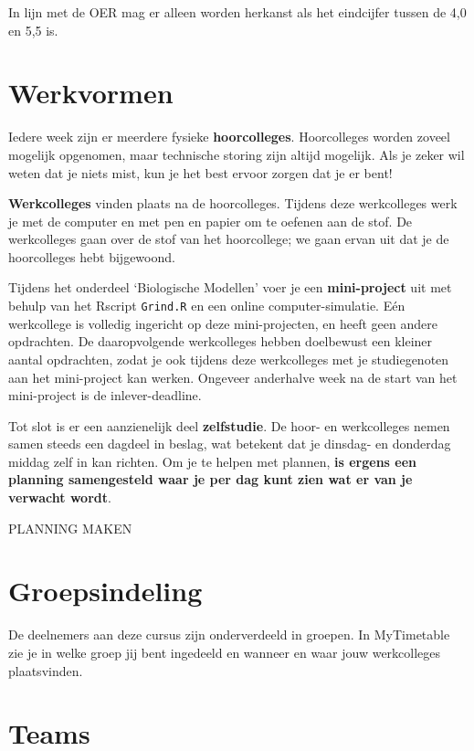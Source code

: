 \documentclass[
  a4paper,
]{scrbook}
\theoremstyle{definition}
\theoremstyle{remark}
\begin{document}
In lijn met de OER mag er alleen worden herkanst als het eindcijfer
tussen de 4,0 en 5,5 is.

\section{Werkvormen}\label{werkvormen}

Iedere week zijn er meerdere fysieke \textbf{hoorcolleges}. Hoorcolleges
worden zoveel mogelijk opgenomen, maar technische storing zijn altijd
mogelijk. Als je zeker wil weten dat je niets mist, kun je het best
ervoor zorgen dat je er bent!

\textbf{Werkcolleges} vinden plaats na de hoorcolleges. Tijdens deze
werkcolleges werk je met de computer en met pen en papier om te oefenen
aan de stof. De werkcolleges gaan over de stof van het hoorcollege; we
gaan ervan uit dat je de hoorcolleges hebt bijgewoond.

Tijdens het onderdeel `Biologische Modellen' voer je een
\textbf{mini-project} uit met behulp van het Rscript \texttt{Grind.R} en
een online computer-simulatie. Eén werkcollege is volledig ingericht op
deze mini-projecten, en heeft geen andere opdrachten. De daaropvolgende
werkcolleges hebben doelbewust een kleiner aantal opdrachten, zodat je
ook tijdens deze werkcolleges met je studiegenoten aan het mini-project
kan werken. Ongeveer anderhalve week na de start van het mini-project is
de inlever-deadline.

Tot slot is er een aanzienelijk deel \textbf{zelfstudie}. De hoor- en
werkcolleges nemen samen steeds een dagdeel in beslag, wat betekent dat
je dinsdag- en donderdag middag zelf in kan richten. Om je te helpen met
plannen, \textbf{is ergens een planning samengesteld waar je per dag
kunt zien wat er van je verwacht wordt}.

PLANNING MAKEN

\section{Groepsindeling}\label{groepsindeling}

De deelnemers aan deze cursus zijn onderverdeeld in groepen. In
MyTimetable zie je in welke groep jij bent ingedeeld en wanneer en waar
jouw werkcolleges plaatsvinden.

\section{Teams}\label{teams}
\end{document}
